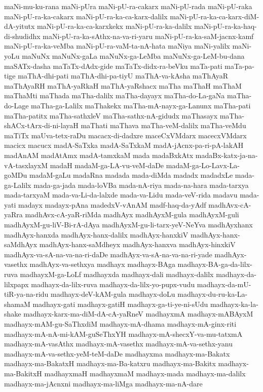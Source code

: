 {maNi-mu-ku-rana
maNi-pUra
maNi-pU-ra-cakarx
maNi-pU-rada
maNi-pU-raka
maNi-pU-ra-ka-cakarx
maNi-pU-ra-ka-ca-karx-dalilx
maNi-pU-ra-ka-ca-karx-diM-dA-yitutx
maNi-pU-ra-ka-ca-karxkekx
maNi-pU-ra-ka-dalilx
maNi-pU-ra-ka-haq-di-shudidhx
maNi-pU-ra-ka-sAthx-na-va-ri-yaru
maNi-pU-ra-ka-saM-jacnx-kamf
maNi-pU-ra-ka-veMba
maNi-pU-ra-vaM-ta-nA-hata
maNiya
maNi-yalilx
maNi-yoLu
maNuNx
maNuNx-gaLa
maNuNx-ga-LeMba
maNuNx-ga-LeM-bu-dana
maSATx-dasha
maTaTx-dAdx-gide
maTaTx-didx-ra-beVku
maTa-pati
maTa-pa-tige
maThA-dhi-pati
maThA-dhi-pa-tiyU
maThA-va-kAsha
maThAyaR
maThAyaRH
maThA-yaRkaH
maThA-yaRshacx
maTha
maThaH
maThaM
maThaMti
maThada
maTha-dalilx
maTha-dayayx
maTha-do-La-gaNa
maTha-do-Lage
maTha-ga-Lalilx
maThakekx
maTha-mA-nayx-ga-Lanunx
maTha-pati
maTha-patitx
maTha-sathxleV
maTha-sathx-nA-gidudx
maThasayx
maTha-shACx-tArx-di-ni-layaH
maThati
maThava
maTha-veM-dalilx
maTha-veMdu
maTiTx
maUva-tetx-raDu
macacx-di-dadxre
maceCxVMdarx
macecxVMdarx
macicx
macucx
madA-SaTxka
madA-SaTxkaM
madA-jAcnx-pa-ri-pA-lakAH
madAnAM
madAtAmx
madA-tamxkaM
mada
madaBxkAtx
madaBx-katx-ja-na-vA-tasxlayxM
madaH
madaM-ga-LA-vu-veM-daDe
madaM-ga-Lo-Lavx-La-goMDu
madaM-gaLu
madaRna
madada
mada-diMda
madadx
madadxLe
mada-ga-Lalilx
mada-ga-jada
mada-loVBa
mada-nA-riya
mada-na-hara
mada-tarxya
mada-tarxyaM
mada-va-Li-da-lalxde
mada-va-Lidu
mada-veV-rida
madavu
mada-yati
madayx
madayx-pAna
madedxV-vAnAM
madf-haq-da-yAdf
madhAvx-cA-yaRra
madhAvx-cA-yaR-riMda
madhAyx
madhAyxM-gula
madhAyxM-guli
madhAyxM-gu-liV-Bi-rA-dAya
madhAyxM-gu-li-tarx-yeV-NeYva
madhAyxhanx
madhAyx-hanxda
madhAyx-hanx-dalilx
madhAyx-hanxkiV
madhAyx-hanx-saMdhAyx
madhAyx-hanx-saMdheyx
madhAyx-hanxva
madhAyx-hinxkiV
madhAyx-va-sA-na-va-na-ri-daDe
madhAyx-va-sA-na-va-na-ri-yade
madhAyx-vasethx
madhAyx-va-sethxya
madhayx
madhayx-BAga
madhayx-BA-ga-da-lilx-ruva
madhayxM-ga-LoLf
madhayxda
madhayx-dali
madhayx-dalilx
madhayx-da-lilxpapx
madhayx-da-lilx-ruva
madhayx-da-lilx-yo-pupx-vudu
madhayx-da-mU-tiR-ya-na-ridu
madhayx-deV-kAM-gula
madhayx-doLu
madhayx-du-ru-ka-La-shamaM
madhayx-gati
madhayx-gatiH
madhayx-ga-ti-ye-ni-sUdu
madhayx-ka-la-shake
madhayx-karx-ma-diM-dA-cA-yaRneV
madhayxmA
madhayx-mABAyxM
madhayx-mAM-gu-SaThxdiM
madhayx-mA-dhama
madhayx-mA-ginx-riti
madhayx-mA-nA-mi-kAM-guSeThxYH
madhayx-mA-shecxY-va-mu-tatxmA
madhayx-mA-vasAthx
madhayx-mA-vasethx
madhayx-mA-va-sethx-yanu
madhayx-mA-va-sethx-yeM-teM-daDe
madhayxma
madhayx-ma-Bakatx
madhayx-ma-BakatxH
madhayx-ma-Ba-katxru
madhayx-ma-Bakitx
madhayx-ma-BakitxH
madhayxmaH
madhayxmaM
madhayx-mada
madhayx-ma-dalilx
madhayx-ma-jAcnxni
madhayx-ma-liMga
madhayx-ma-nA-dare
}
